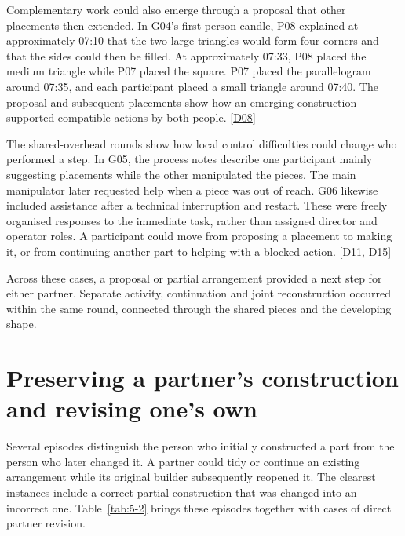 Complementary work could also emerge through a proposal that other placements then extended. In G04's first-person candle, P08 explained at approximately 07:10 that the two large triangles would form four corners and that the sides could then be filled. At approximately 07:33, P08 placed the medium triangle while P07 placed the square. P07 placed the parallelogram around 07:35, and each participant placed a small triangle around 07:40. The proposal and subsequent placements show how an emerging construction supported compatible actions by both people. [\hyperlink{src:D08}{D08}]

The shared-overhead rounds show how local control difficulties could change who performed a step. In G05, the process notes describe one participant mainly suggesting placements while the other manipulated the pieces. The main manipulator later requested help when a piece was out of reach. G06 likewise included assistance after a technical interruption and restart. These were freely organised responses to the immediate task, rather than assigned director and operator roles. A participant could move from proposing a placement to making it, or from continuing another part to helping with a blocked action. [\hyperlink{src:D11}{D11}, \hyperlink{src:D15}{D15}]

Across these cases, a proposal or partial arrangement provided a next step for either partner. Separate activity, continuation and joint reconstruction occurred within the same round, connected through the shared pieces and the developing shape.

\section{Preserving a partner's construction and revising one's own}\label{sec:5-3}

Several episodes distinguish the person who initially constructed a part from the person who later changed it. A partner could tidy or continue an existing arrangement while its original builder subsequently reopened it. The clearest instances include a correct partial construction that was changed into an incorrect one. Table~\ref{tab:5-2} brings these episodes together with cases of direct partner revision.

